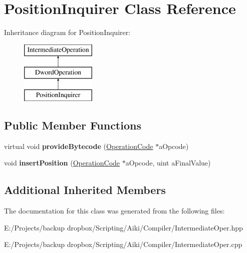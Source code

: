 \hypertarget{a00018}{\section{Position\+Inquirer Class Reference}
\label{a00018}
}
Inheritance diagram for Position\+Inquirer\+:\begin{figure}[H]
\begin{center}
\leavevmode
\includegraphics[height=3.000000cm]{d1/d2b/a00018}
\end{center}
\end{figure}
\subsection*{Public Member Functions}
\begin{DoxyCompactItemize}
\item 
\hypertarget{a00018_a0bf888ca94c67257f2c00e7392c8a565}{virtual void {\bfseries provide\+Bytecode} (\hyperlink{a00015}{Operation\+Code} $\ast$a\+Opcode)}\label{a00018_a0bf888ca94c67257f2c00e7392c8a565}

\item 
\hypertarget{a00018_a7218aa1c9025c1763112ac8eb6ebb2fd}{void {\bfseries insert\+Position} (\hyperlink{a00015}{Operation\+Code} $\ast$a\+Opcode, uint a\+Final\+Value)}\label{a00018_a7218aa1c9025c1763112ac8eb6ebb2fd}

\end{DoxyCompactItemize}
\subsection*{Additional Inherited Members}


The documentation for this class was generated from the following files\+:\begin{DoxyCompactItemize}
\item 
E\+:/\+Projects/backup dropbox/\+Scripting/\+Aiki/\+Compiler/Intermediate\+Oper.\+hpp\item 
E\+:/\+Projects/backup dropbox/\+Scripting/\+Aiki/\+Compiler/Intermediate\+Oper.\+cpp\end{DoxyCompactItemize}
